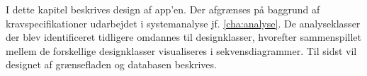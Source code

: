 I dette kapitel beskrives design af app'en. Der afgrænses på baggrund af kravspecifikationer udarbejdet i systemanalyse jf. \autoref{cha:analyse}. De analyseklasser der blev identificeret tidligere omdannes til designklasser, hvorefter sammenspillet mellem de forskellige designklasser visualiseres i sekvensdiagrammer. Til sidst vil designet af grænsefladen og databasen beskrives.

 





